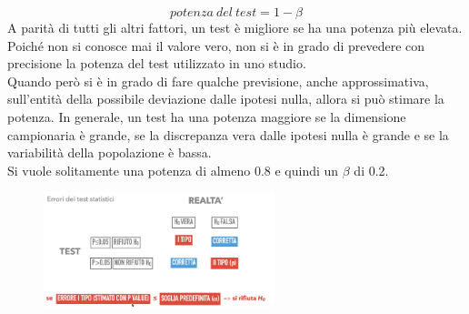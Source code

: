 \documentclass[10pt, draft]{book}
\begin{document}
\begin{equation}
    potenza\ del\ test = 1-\beta
\end{equation}
A parità di tutti gli altri fattori, un test è migliore se ha una potenza più elevata.
\\
Poiché non si conosce mai il valore vero, non si è in grado di prevedere con precisione la potenza del test utilizzato in uno studio. 
\\
Quando però si è in grado di fare qualche previsione, anche approssimativa, sull'entità della possibile deviazione dalle ipotesi nulla, allora si può stimare la potenza. In generale, un test ha una potenza maggiore se la dimensione campionaria è grande, se la discrepanza vera dalle ipotesi nulla è grande e se la variabilità della popolazione è bassa.
\\
Si vuole solitamente una potenza di almeno 0.8 e quindi un $\beta$ di 0.2.
\begin{figure}[h]\label{erroriverificaipotesi}
    \centering
    \includegraphics[width=0.6\textwidth]{erroriverificaipotesi}
    \caption{\small{}}
\end{figure}
\end{document}
